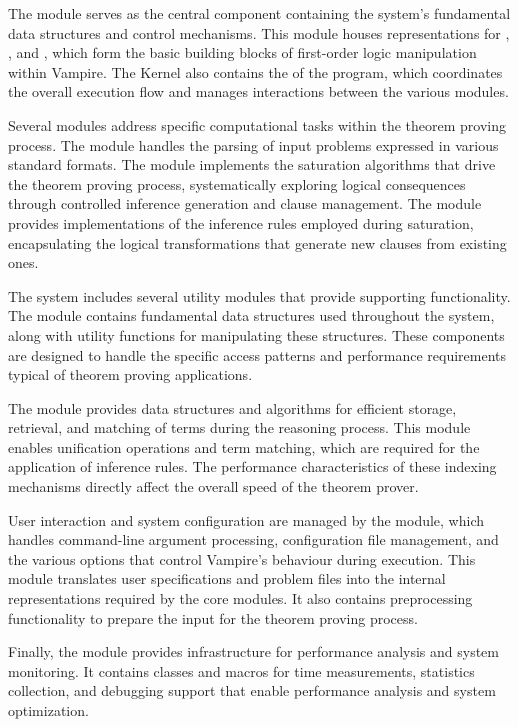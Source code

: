The  module serves as the central component containing the system's fundamental data structures and control mechanisms.
This module houses representations for , , and , which form the basic building blocks of first-order logic manipulation within Vampire.
The Kernel also contains the  of the program, which coordinates the overall execution flow and manages interactions between the various modules.

Several modules address specific computational tasks within the theorem proving process.
The  module handles the parsing of input problems expressed in various standard formats.
The  module implements the saturation algorithms that drive the theorem proving process, systematically exploring logical consequences through controlled inference generation and clause management.
The  module provides implementations of the inference rules employed during saturation, encapsulating the logical transformations that generate new clauses from existing ones.

The system includes several utility modules that provide supporting functionality.
The  module contains fundamental data structures used throughout the system, along with utility functions for manipulating these structures.
These components are designed to handle the specific access patterns and performance requirements typical of theorem proving applications.

The  module provides data structures and algorithms for efficient storage, retrieval, and matching of terms during the reasoning process.
This module enables unification operations and term matching, which are required for the application of inference rules.
The performance characteristics of these indexing mechanisms directly affect the overall speed of the theorem prover.

User interaction and system configuration are managed by the  module, which handles command-line argument processing, configuration file management, and the various options that control Vampire's behaviour during execution.
This module translates user specifications and problem files into the internal representations required by the core modules.
It also contains preprocessing functionality to prepare the input for the theorem proving process.

Finally, the  module provides infrastructure for performance analysis and system monitoring.
It contains classes and macros for time measurements, statistics collection, and debugging support that enable performance analysis and system optimization.




